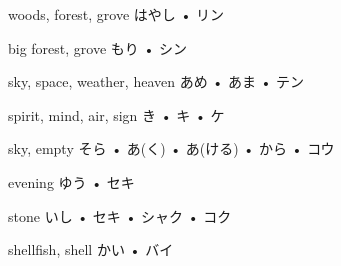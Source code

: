 



\setcounter{cardnum}{25}

		{woods, forest, grove}
		{はやし • リン}
		{}{}
		{}{}
		{}{}
		{}{}
		{}{}

		{big forest, grove}
		{もり • シン}
		{}{}
		{}{}
		{}{}
		{}{}
		{}{}

		{sky, space, weather, heaven}
		{あめ • あま • テン}
		{}{}
		{}{}
		{}{}
		{}{}
		{}{}

		{spirit, mind, air, sign}
		{き • キ • ケ}
		{}{}
		{}{}
		{}{}
		{}{}
		{}{}

		{sky, empty}
		{そら • あ(く) • あ(ける) • から • コウ}
		{}{}
		{}{}
		{}{}
		{}{}
		{}{}

		{evening}
		{ゆう • セキ}
		{}{}
		{}{}
		{}{}
		{}{}
		{}{}

		{stone}
		{いし • セキ • シャク • コク}
		{}{}
		{}{}
		{}{}
		{}{}
		{}{}

		{shellfish, shell}
		{かい • バイ}
		{}{}
		{}{}
		{}{}
		{}{}
		{}{}

